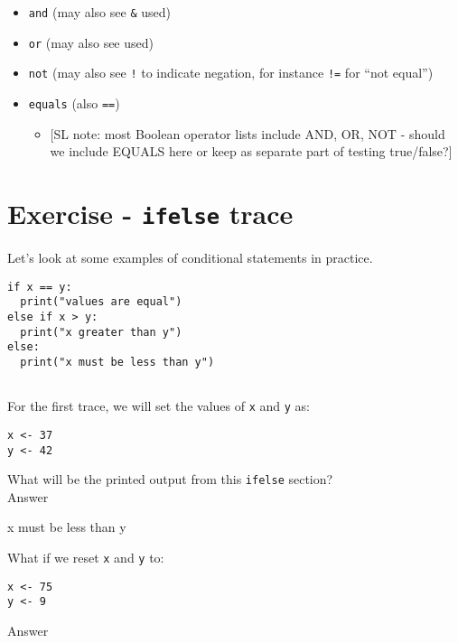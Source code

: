 \documentclass[
]{book}
\providecommand{\tightlist}{%
  \setlength{\itemsep}{0pt}\setlength{\parskip}{0pt}}
\begin{document}
\begin{itemize}
\tightlist
\item
  \texttt{and} (may also see \texttt{\&} used)
\item
  \texttt{or} (may also see \texttt{\textbar{}} used)
\item
  \texttt{not} (may also see \texttt{!} to indicate negation, for instance \texttt{!=} for ``not equal'')
\item
  \texttt{equals} (also \texttt{==})

  \begin{itemize}
  \tightlist
  \item
    {[}SL note: most Boolean operator lists include AND, OR, NOT - should we include EQUALS here or keep as separate part of testing true/false?{]}
  \end{itemize}
\end{itemize}

\section{\texorpdfstring{Exercise - \texttt{ifelse} trace}{Exercise - ifelse trace}}\label{exercise---ifelse-trace}

Let's look at some examples of conditional statements in practice.

\begin{verbatim}
if x == y:
  print("values are equal")
else if x > y:
  print("x greater than y")
else:
  print("x must be less than y")
  
\end{verbatim}

For the first trace, we will set the values of \texttt{x} and \texttt{y} as:

\begin{verbatim}
x <- 37
y <- 42
\end{verbatim}

What will be the printed output from this \texttt{ifelse} section?\\

Answer

x must be less than y

\hfill\break

What if we reset \texttt{x} and \texttt{y} to:

\begin{verbatim}
x <- 75
y <- 9
\end{verbatim}

Answer
\end{document}
